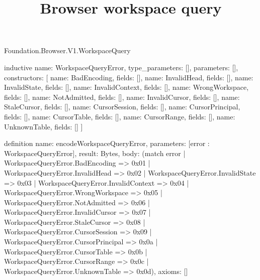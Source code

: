 \begin{lexlean}{Foundation.Browser.V1.WorkspaceQuery}
\title{Browser workspace query}
\begin{semanticmodule}
inductive{
  name: WorkspaceQueryError,
  type_parameters: [],
  parameters: [],
  constructors: [
    {name: BadEncoding, fields: []},
    {name: InvalidHead, fields: []},
    {name: InvalidState, fields: []},
    {name: InvalidContext, fields: []},
    {name: WrongWorkspace, fields: []},
    {name: NotAdmitted, fields: []},
    {name: InvalidCursor, fields: []},
    {name: StaleCursor, fields: []},
    {name: CursorSession, fields: []},
    {name: CursorPrincipal, fields: []},
    {name: CursorTable, fields: []},
    {name: CursorRange, fields: []},
    {name: UnknownTable, fields: []}
  ]
}

definition{
  name: encodeWorkspaceQueryError,
  parameters: [error : WorkspaceQueryError],
  result: Bytes,
  body: (match error
    | WorkspaceQueryError.BadEncoding => 0x01
    | WorkspaceQueryError.InvalidHead => 0x02
    | WorkspaceQueryError.InvalidState => 0x03
    | WorkspaceQueryError.InvalidContext => 0x04
    | WorkspaceQueryError.WrongWorkspace => 0x05
    | WorkspaceQueryError.NotAdmitted => 0x06
    | WorkspaceQueryError.InvalidCursor => 0x07
    | WorkspaceQueryError.StaleCursor => 0x08
    | WorkspaceQueryError.CursorSession => 0x09
    | WorkspaceQueryError.CursorPrincipal => 0x0a
    | WorkspaceQueryError.CursorTable => 0x0b
    | WorkspaceQueryError.CursorRange => 0x0c
    | WorkspaceQueryError.UnknownTable => 0x0d),
  axioms: []
}


\end{semanticmodule}
\end{lexlean}
